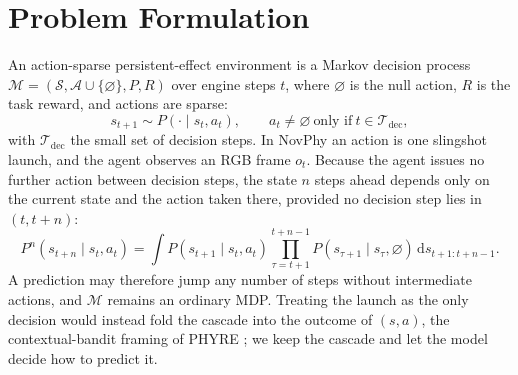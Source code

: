\section{Problem Formulation}
\label{sec:mth:setting}

An action-sparse persistent-effect environment is a Markov decision process $\mathcal{M}=(\mathcal{S},\mathcal{A}\cup\{\varnothing\},P,R)$ over engine steps $t$, where $\varnothing$ is the null action, $R$ is the task reward, and actions are sparse:
\begin{equation}
s_{t+1}\sim P(\cdot\mid s_t,a_t),\qquad a_t\neq\varnothing\ \text{only if}\ t\in\mathcal{T}_{\mathrm{dec}},
\label{eq:mdp}
\end{equation}
with $\mathcal{T}_{\mathrm{dec}}$ the small set of decision steps. In NovPhy an action is one slingshot launch, and the agent observes an RGB frame $o_t$. Because the agent issues no further action between decision steps, the state $n$ steps ahead depends only on the current state and the action taken there, provided no decision step lies in $(t,t+n)$:
\begin{equation}
P^{n}(s_{t+n}\mid s_t,a_t)=\int P(s_{t+1}\mid s_t,a_t)\prod_{\tau=t+1}^{t+n-1}P(s_{\tau+1}\mid s_\tau,\varnothing)\,\mathrm{d}s_{t+1:t+n-1}.
\label{eq:kernel}
\end{equation}
A prediction may therefore jump any number of steps without intermediate actions, and $\mathcal{M}$ remains an ordinary MDP. Treating the launch as the only decision would instead fold the cascade into the outcome of $(s,a)$, the contextual-bandit framing of PHYRE \citep{bakhtin2019phyre}; we keep the cascade and let the model decide how to predict it.

